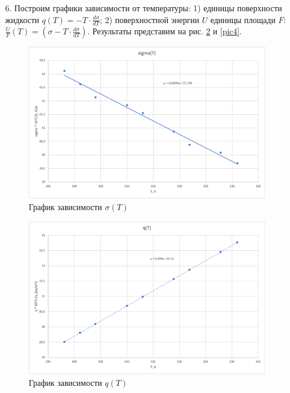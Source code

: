 \documentclass[a4paper, 12pt]{article}
\begin{document}
\begin{enumerate}
        \item[6.] Построим графики зависимости от температуры: 1) единицы поверхности жидкости $q(T) = -T \cdot \frac{d\sigma}{dT}$; 2) поверхностной энергии $U$ единицы площади $F$: $\frac{U}{F}(T) = (\sigma - T \cdot \frac{d\sigma}{dT})$. Результаты представим на рис. \ref{pic3} и \ref{pic4}.
    
        \newpage
                
        \begin{figure}[ht]
            \centering
            \includegraphics[width=0.75\linewidth]{images/sigma(T).png}
            \caption{График зависимости $\sigma (T)$}
            \label{pic2}
        \end{figure}
        
        \vspace{2cm}
        
        \begin{figure}[ht]
            \centering
            \includegraphics[width=0.75\linewidth]{images/q(T).png}
            \caption{График зависимости $q(T)$}
            \label{pic3}
        \end{figure}
        

\end{enumerate}
\end{document}
